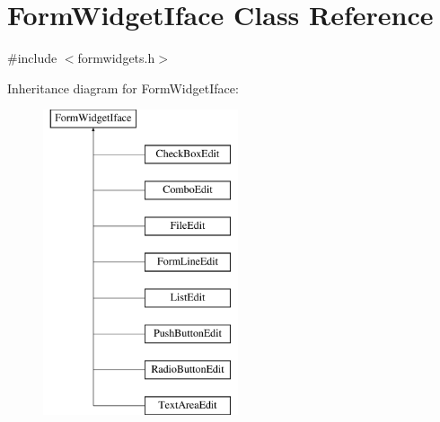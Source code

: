\hypertarget{classFormWidgetIface}{\section{Form\+Widget\+Iface Class Reference}
\label{classFormWidgetIface}
}


{\ttfamily \#include $<$formwidgets.\+h$>$}

Inheritance diagram for Form\+Widget\+Iface\+:\begin{figure}[H]
\begin{center}
\leavevmode
\includegraphics[height=9.000000cm]{classFormWidgetIface}
\end{center}
\end{figure}
